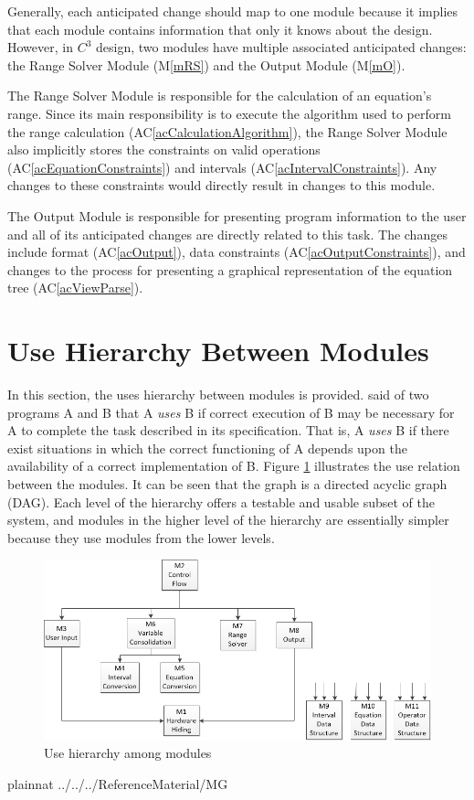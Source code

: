 \documentclass[12pt, titlepage]{article}
\newcommand{\acref}[1]{AC\ref{#1}}
\newcommand{\mref}[1]{M\ref{#1}}
\newcommand{\prognameAbbrv}{$C^{3}$}
\begin{document}
Generally, each anticipated change should map to one module because it implies 
that each module contains information that only it knows about the design. 
However, in \prognameAbbrv{} design, two modules have multiple associated 
anticipated changes: the Range Solver Module (\mref{mRS}) and the Output Module 
(\mref{mO}). 

The Range Solver Module is responsible for the calculation of an equation's 
range. Since its main responsibility is to execute the algorithm used to 
perform the range calculation (\acref{acCalculationAlgorithm}), the Range 
Solver Module also implicitly stores the constraints on valid operations 
(\acref{acEquationConstraints}) and intervals (\acref{acIntervalConstraints}). 
Any changes to these constraints would directly result in changes to 
this module.

The Output Module is responsible for presenting program information to the 
user and all of its anticipated changes are directly related to this task. The 
changes include format (\acref{acOutput}), data constraints 
(\acref{acOutputConstraints}), and changes to the process for presenting a 
graphical representation of the equation tree (\acref{acViewParse}).

\newpage

\section{Use Hierarchy Between Modules} 
\label{SecUse}
In this section, the uses hierarchy between modules is
provided. \citet{Parnas1978} said of two programs A and B that A {\em uses} B if
correct execution of B may be necessary for A to complete the task described in
its specification. That is, A {\em uses} B if there exist situations in which
the correct functioning of A depends upon the availability of a correct
implementation of B.  Figure \ref{FigUH} illustrates the use relation between
the modules. It can be seen that the graph is a directed acyclic graph
(DAG). Each level of the hierarchy offers a testable and usable subset of the
system, and modules in the higher level of the hierarchy are essentially simpler
because they use modules from the lower levels.

\begin{figure}[H]
\centering
\includegraphics[width=\textwidth]{figures/ModuleGraph.png}
\caption{Use hierarchy among modules}
\label{FigUH}
\end{figure}

\newpage

 {plainnat}
 {../../../ReferenceMaterial/MG}
\end{document}
